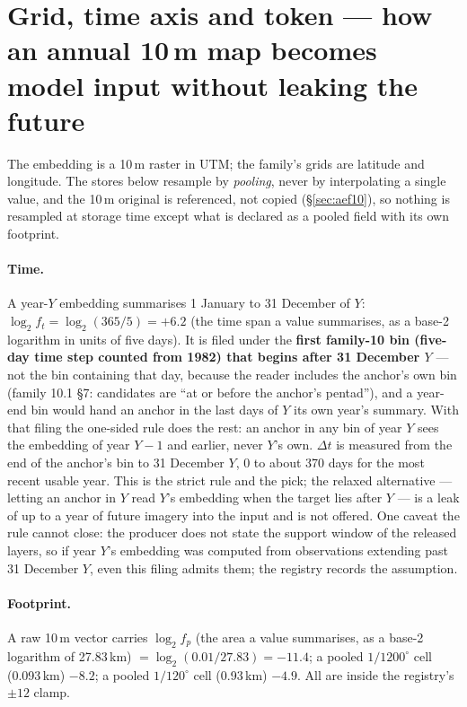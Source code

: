 \documentclass[10pt]{article}
\begin{document}
\section{Grid, time axis and token --- how an annual 10\,m map becomes model input without leaking the future}

The embedding is a 10\,m raster in UTM; the family's grids are latitude and
longitude. The stores below resample by \emph{pooling}, never by
interpolating a single value, and the 10\,m original is referenced, not
copied (\S\ref{sec:aef10}), so nothing is resampled at storage time except what is
declared as a pooled field with its own footprint.

\paragraph{Time.} A year-$Y$ embedding summarises 1 January to 31 December
of $Y$: $\log_2 f_t = \log_2(365/5) = +6.2$ (the time span a value summarises, as a base-2 logarithm in units of five days). It is filed under the
\textbf{first family-10 bin (five-day time step counted from 1982) that begins after 31 December $Y$} --- not the
bin containing that day, because the reader includes the anchor's own bin
(family 10.1 \S7: candidates are ``at or before the anchor's pentad''), and
a year-end bin would hand an anchor in the last days of $Y$ its own year's
summary. With that filing the one-sided rule does the rest: an anchor in
any bin of year $Y$ sees the embedding of year $Y-1$ and earlier, never
$Y$'s own. $\Delta t$ is measured from the end of the anchor's bin to
31 December $Y$, 0 to about 370 days for the most recent usable year. This
is the strict rule and the pick; the relaxed alternative --- letting an
anchor in $Y$ read $Y$'s embedding when the target lies after $Y$ --- is a
leak of up to a year of future imagery into the input and is not offered.
One caveat the rule cannot close: the producer does not state the support
window of the released layers, so if year $Y$'s embedding was computed
from observations extending past 31 December $Y$, even this filing admits
them; the registry records the assumption.

\paragraph{Footprint.} A raw 10\,m vector carries $\log_2 f_p$ (the area a value summarises, as a base-2 logarithm of 27.83\,km) $=
\log_2(0.01/27.83) = -11.4$; a pooled $1/1200^\circ$ cell (0.093\,km)
$-8.2$; a pooled $1/120^\circ$ cell (0.93\,km) $-4.9$. All are inside the
registry's $\pm 12$ clamp.
\end{document}
